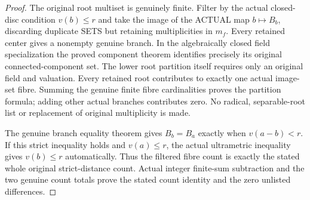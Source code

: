 \begin{proof}
The original root multiset is genuinely finite. Filter by the actual
closed-disc condition $v(b)\le r$ and take the image of the ACTUAL map
$b\mapsto B_b$, discarding duplicate SETS but retaining multiplicities in
$m_f$. Every retained center gives a nonempty genuine branch. In the algebraically
closed field specialization the proved component theorem identifies
precisely its original connected-component set. The lower root partition itself
requires only an original field and valuation.
Every retained root contributes to exactly one actual image-set fibre.
Summing the genuine finite fibre cardinalities proves the partition formula;
adding other actual branches contributes zero. No radical, separable-root
list or replacement of original multiplicity is made.

The genuine branch equality theorem gives $B_b=B_a$ exactly when
$v(a-b)<r$. If this strict inequality holds and $v(a)\le r$, the actual
ultrametric inequality gives $v(b)\le r$ automatically. Thus the filtered
fibre count is exactly the stated whole original strict-distance count.
Actual integer finite-sum subtraction and the two genuine count totals prove
the stated count identity and the zero unlisted differences.
\end{proof}

